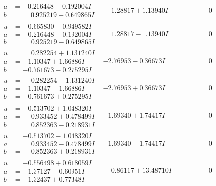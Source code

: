 \documentclass[1p]{elsarticle_modified}
\theoremstyle{definition}
\begin{document}
$$\begin{array}{c|c|c}
\begin{aligned}
a &= -0.216448 + 0.192004 I \\
b &= \phantom{-}0.925219 + 0.649865 I\end{aligned}
 & \phantom{-}1.28817 + 1.13940 I & \phantom{-0.000000 } 0 \\ \hline\begin{aligned}
u &= -0.665830 - 0.949582 I \\
a &= -0.216448 - 0.192004 I \\
b &= \phantom{-}0.925219 - 0.649865 I\end{aligned}
 & \phantom{-}1.28817 - 1.13940 I & \phantom{-0.000000 } 0 \\ \hline\begin{aligned}
u &= \phantom{-}0.282254 + 1.131240 I \\
a &= -1.10347 + 1.66886 I \\
b &= -0.761673 - 0.275295 I\end{aligned}
 & -2.76953 - 0.36673 I & \phantom{-0.000000 } 0 \\ \hline\begin{aligned}
u &= \phantom{-}0.282254 - 1.131240 I \\
a &= -1.10347 - 1.66886 I \\
b &= -0.761673 + 0.275295 I\end{aligned}
 & -2.76953 + 0.36673 I & \phantom{-0.000000 } 0 \\ \hline\begin{aligned}
u &= -0.513702 + 1.048320 I \\
a &= \phantom{-}0.933452 + 0.478499 I \\
b &= \phantom{-}0.852363 - 0.218931 I\end{aligned}
 & -1.69340 + 1.74417 I & \phantom{-0.000000 } 0 \\ \hline\begin{aligned}
u &= -0.513702 - 1.048320 I \\
a &= \phantom{-}0.933452 - 0.478499 I \\
b &= \phantom{-}0.852363 + 0.218931 I\end{aligned}
 & -1.69340 - 1.74417 I & \phantom{-0.000000 } 0 \\ \hline\begin{aligned}
u &= -0.556498 + 0.618059 I \\
a &= -1.37127 - 0.60951 I \\
b &= -1.32437 + 0.77348 I\end{aligned}
 & \phantom{-}0.86117 + 13.48710 I & \phantom{-0.000000 } 0 \\ \hline\begin{aligned}

\end{aligned}
\end{array}$$
\end{document}
